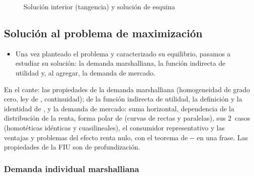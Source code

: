 \documentclass[11pt]{article}
\begin{document}
\begin{figure}[H]
\centering
\caption{Solución interior (tangencia) y solución de esquina}\label{fig:solucion-interior-esquina}
\end{figure}

\subsection{Solución al problema de maximización}\label{sec:solucion-problema-maximizacion}

\begin{itemize}
\item Una vez planteado el problema y caracterizado su equilibrio, pasamos a estudiar su solución: la demanda marshalliana, la función indirecta de utilidad y, al agregar, la demanda de mercado.
\end{itemize}

\begin{notaopositor}
En el cante: las propiedades de la demanda marshalliana (homogeneidad de grado cero, ley de , continuidad); de la función indirecta de utilidad, la definición y la identidad de , y la demanda de mercado: suma horizontal, dependencia de la distribución de la renta, forma polar de  (curvas de  rectas y paralelas), sus 2~casos (homotéticas idénticas y cuasilineales), el consumidor representativo y las ventajas y problemas del efecto renta nulo, con el teorema de -- en una frase. Las propiedades de la FIU son de profundización.
\end{notaopositor}

\subsubsection{Demanda individual marshalliana}\label{sec:demanda-individual-marshalliana}
\end{document}
